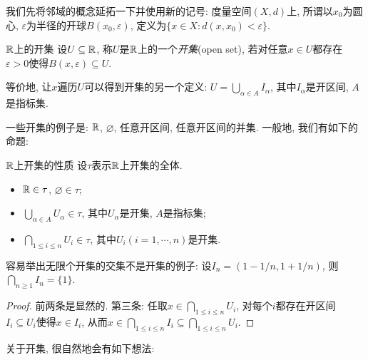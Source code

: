 我们先将邻域的概念延拓一下并使用新的记号: 度量空间$(X,d)$上, 所谓以$x_0$为圆心, $\varepsilon$为半径的开球$B(x_0,\varepsilon)$, 定义为$\{ x \in X:d(x,x_0)<\varepsilon \}$. 

\begin{definition}{$\mathbb{R}$上的开集}
	设$U \subseteq \mathbb{R}$, 称$U$是$\mathbb{R}$上的一个\textit{开集}(open set), 若对任意$x \in U$都存在$\varepsilon >0$使得$B(x,\varepsilon) \subseteq U$. 
\end{definition}
\begin{remark}
	等价地, 让$x$遍历$U$可以得到开集的另一个定义: $U=\bigcup_{\alpha \in A} I_{\alpha}$, 其中$I_{\alpha}$是开区间, $A$是指标集. 
\end{remark}

一些开集的例子是: $\mathbb{R}$, $\varnothing$, 任意开区间, 任意开区间的并集. 一般地, 我们有如下的命题: 

\begin{proposition}{$\mathbb{R}$上开集的性质}
	设$\tau$表示$\mathbb{R}$上开集的全体. 
	\begin{itemize}
		\item $\mathbb{R} \in \tau$, $\varnothing \in \tau$; 
		\item $\bigcup_{\alpha \in A} U_{\alpha} \in \tau$, 其中$U_{\alpha}$是开集, $A$是指标集; 
		\item $\bigcap_{1 \leq i \leq n} U_i \in \tau$, 其中$U_i(i=1,\cdots ,n)$是开集. 
	\end{itemize}
\end{proposition}
\begin{remark}
	容易举出无限个开集的交集不是开集的例子: 设$I_n=(1-1/n,1+1/n)$, 则$\bigcap_{n\geq 1}I_n = \{ 1 \}$. 
\end{remark}
\begin{proof}
	前两条是显然的. 第三条: 任取$x \in \bigcap_{1 \leq i \leq n} U_i$, 对每个$i$都存在开区间$I_i \subseteq U_i$使得$x \in I_i$, 从而$x \in \bigcap_{1 \leq i \leq n} I_i \subseteq \bigcap_{1 \leq i \leq n} U_i$. 
\end{proof}

关于开集, 很自然地会有如下想法: 

